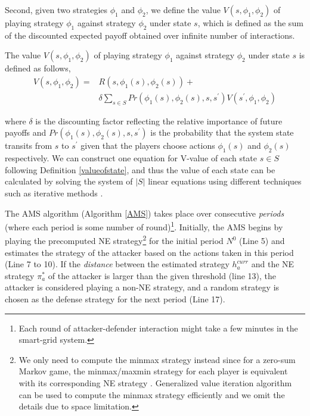Second, given two strategies $\phi_1$ and $\phi_2$, we define the value $V(s, \phi_1, \phi_2)$ of playing strategy $\phi_1$ against strategy $\phi_2$ under state $s$, which is defined as the sum of the discounted expected payoff obtained over infinite number of interactions.
\begin{definition}
\label{valueofstate}
The value $V(s, \phi_1, \phi_2)$ of playing strategy $\phi_1$ against strategy $\phi_2$ under state $s$ is defined as follows, 
\begin{equation}
\begin{split}
V(s, \phi_1, \phi_2) = &R(s, \phi_1(s), \phi_2(s)) +\\& \delta\sum_{s\in S} Pr(\phi_1(s), \phi_2(s), s, s^\prime)V(s^\prime, \phi_1, \phi_2)
\end{split}
\end{equation}
\end{definition}
where $\delta$ is the discounting factor reflecting the relative importance of future payoffs and $Pr(\phi_1(s), \phi_2(s), s, s^\prime)$ is the probability that the system state transits from $s$ to $s^\prime$ given that the players choose actions $\phi_1(s)$ and $\phi_2(s)$ respectively. We can construct one equation for V-value of each state $s\in S$ following Definition \ref{valueofstate}, and thus the value of each state can be calculated by solving the system of $|S|$ linear equations using different techniques such as iterative methods \cite{eisenstat1983variational}.

The AMS algorithm (Algorithm \ref{AMS}) takes place over consecutive \textit{periods} (where each period is some number of round)\footnote{Each round of attacker-defender interaction might take a few minutes in the smart-grid system.}. Initially, the AMS begins by playing the precomputed NE strategy\footnote{We only need to compute the minmax strategy instead since for a zero-sum Markov game, the minmax/maxmin strategy for each player is equivalent with its corresponding NE strategy \cite{sigaud2013markov}. Generalized value iteration algorithm \cite{sigaud2013markov} can be used to compute the minmax strategy efficiently and we omit the details due to space limitation.} for the initial period $N^0$ (Line 5) and estimates the strategy of the attacker based on the actions taken in this period (Line 7 to 10). If the \emph{distance} between the estimated strategy $h_a^{curr}$ and the NE strategy $\pi_a^*$ of the attacker is larger than the given threshold (line 13), the attacker is considered playing a non-NE strategy, and a random strategy is chosen as the defense strategy for the next period (Line 17). 

